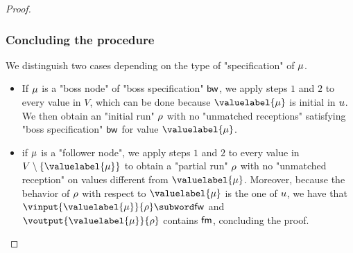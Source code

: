 \begin{proof}
 
\subsubsection{Concluding the procedure}
We distinguish two cases depending on the type of "specification" of $\mu$.
\begin{itemize}
\item If $\mu$ is a "boss node" of "boss specification" $\mathsf{bw}$, we apply steps $1$ and $2$ to every value in $V$, which can be done because $\valuelabel{\node}$ is initial in $u$. We then obtain an "initial run" $\rho$ with no "unmatched receptions" satisfying "boss specification" $\mathsf{bw}$ for value $\valuelabel{\node}$.
\item if $\mu$ is a "follower node", we apply steps $1$ and $2$ to every value in $V \setminus \set{\valuelabel{\node}}$ to obtain a "partial run" $\rho$ with no "unmatched reception" on values different from $\valuelabel{\node}$. Moreover, because the behavior of $\rho$ with respect to $\valuelabel{\node}$ is the one of $u$, we have that $\vinput{\valuelabel{\node}}{\run} \subword \followwordspec$ and $\voutput{\valuelabel{\node}}{\run}$ contains $\mathsf{fm}$, concluding the proof. 
\end{itemize}
\end{proof}